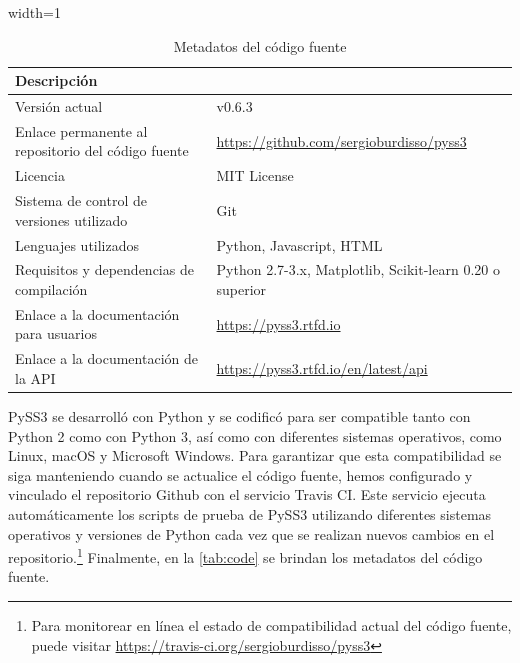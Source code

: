 \begin{table}[t!]
\centering
\begin{adjustbox}{width=1\textwidth}
\small
\begin{tabular}{l l}
\hline
\textbf{Descripción} &  \\
\hline
Versión actual & v0.6.3 \\
Enlace permanente al repositorio del código fuente & \href{https://github.com/sergioburdisso/pyss3}{\url{https://github.com/sergioburdisso/pyss3}} \\
Licencia   & MIT License \\
Sistema de control de versiones utilizado & Git \\
Lenguajes utilizados &  Python, Javascript, HTML\\
Requisitos y dependencias de compilación & Python 2.7-3.x, Matplotlib, Scikit-learn 0.20 o superior \\
Enlace a la documentación para usuarios &  \href{https://pyss3.readthedocs.io}{\url{https://pyss3.rtfd.io}} \\
Enlace a la documentación de la API & \href{https://pyss3.readthedocs.io/en/latest/api/}{\url{https://pyss3.rtfd.io/en/latest/api}} \\
\hline
\end{tabular}
\end{adjustbox}
\caption{Metadatos del código fuente}
\label{tab:code} 
\end{table}

PySS3 se desarrolló con Python y se codificó para ser compatible tanto con Python 2 como con Python 3, así como con diferentes sistemas operativos, como Linux, macOS y Microsoft Windows. Para garantizar que esta compatibilidad se siga manteniendo cuando se actualice el código fuente, hemos configurado y vinculado el repositorio Github con el servicio Travis CI. Este servicio ejecuta automáticamente los scripts de prueba de PySS3 utilizando diferentes sistemas operativos y versiones de Python cada vez que se realizan nuevos cambios en el repositorio.\footnote{Para monitorear en línea el estado de compatibilidad actual del código fuente, puede visitar  \href{https://travis-ci.org/sergioburdisso/pyss3}{\url{https://travis-ci.org/sergioburdisso/pyss3}}} Finalmente, en la \autoref{tab:code} se brindan los metadatos del código fuente.


